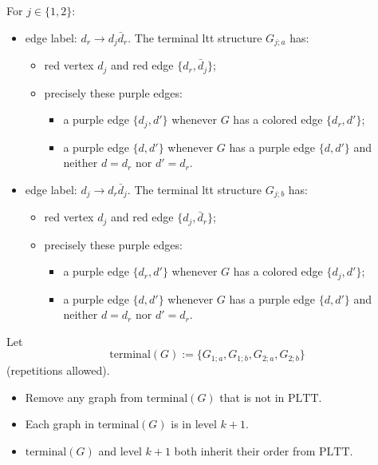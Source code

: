 \documentclass[11pt]{article}
\theoremstyle{definition}
\begin{document}
For $j\in\{1,2\}$:
\begin{itemize}
  \item[(2a)] edge label: $d_r \to d_j\bar{d}_r$.
        The terminal ltt structure $G_{j;a}$ has:
        \begin{itemize}
          \item red vertex $d_j$ and red edge $\{d_r,\bar{d}_j\}$;
          \item precisely these purple edges:
                \begin{itemize}
                  \item a purple edge $\{d_j,d'\}$ whenever $G$ has a colored edge
                        $\{d_r,d'\}$;
                  \item a purple edge $\{d,d'\}$ whenever $G$ has a purple edge
                        $\{d,d'\}$ and neither $d=d_r$ nor $d'=d_r$.
                \end{itemize}
        \end{itemize}
  \item[(2b)] edge label: $d_j \to d_r\bar{d}_j$.
        The terminal ltt structure $G_{j;b}$ has:
        \begin{itemize}
          \item red vertex $d_j$ and red edge $\{d_j,\bar{d}_r\}$;
          \item precisely these purple edges:
                \begin{itemize}
                  \item a purple edge $\{d_r,d'\}$ whenever $G$ has a colored edge
                        $\{d_j,d'\}$;
                  \item a purple edge $\{d,d'\}$ whenever $G$ has a purple edge
                        $\{d,d'\}$ and neither $d=d_r$ nor $d'=d_r$.
                \end{itemize}
        \end{itemize}
\end{itemize}

Let
\[
\mathrm{terminal}(G):=\{G_{1;a},G_{1;b},G_{2;a},G_{2;b}\}
\]
(repetitions allowed).
\begin{itemize}
  \item Remove any graph from $\mathrm{terminal}(G)$ that is not in $\mathrm{PLTT}$.
  \item Each graph in $\mathrm{terminal}(G)$ is in level $k+1$.
  \item $\mathrm{terminal}(G)$ and level $k+1$ both inherit their order from
        $\mathrm{PLTT}$.
\end{itemize}
\end{document}
